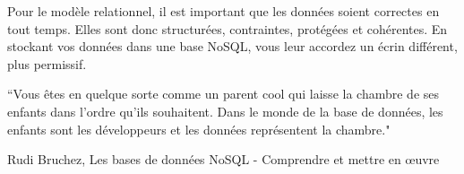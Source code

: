	Pour le modèle relationnel, il est important que les données soient correctes en tout temps. Elles sont donc structurées, contraintes, protégées et cohérentes. En stockant vos données dans une base NoSQL, vous leur accordez un écrin différent, plus permissif.
	\epigraph{``Vous êtes en quelque sorte comme un parent cool qui laisse la chambre de ses enfants dans l'ordre qu'ils souhaitent. Dans le monde de la base de données, les enfants sont les développeurs et les données représentent la chambre."}{\textup{Rudi Bruchez}, Les bases de données NoSQL - Comprendre et mettre en œuvre \cite{BD_NoSQL}}
